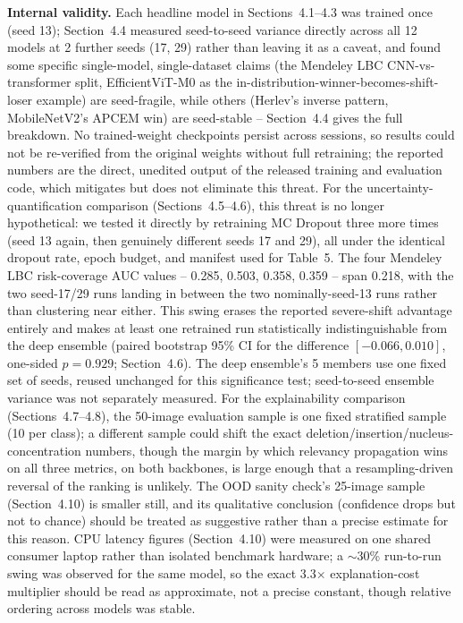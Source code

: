 \documentclass[runningheads]{llncs}
\begin{document}
\textbf{Internal validity.} Each headline model in Sections~4.1--4.3 was
trained once (seed 13); Section~4.4 measured seed-to-seed variance
directly across all 12 models at 2 further seeds (17, 29) rather than
leaving it as a caveat, and found some specific single-model,
single-dataset claims (the Mendeley LBC CNN-vs-transformer split,
EfficientViT-M0 as the in-distribution-winner-becomes-shift-loser
example) are seed-fragile, while others (Herlev's inverse pattern,
MobileNetV2's APCEM win) are seed-stable -- Section~4.4 gives the full
breakdown. No trained-weight checkpoints persist across sessions, so
results could not be re-verified from the original weights without full
retraining; the reported numbers are the direct, unedited output of the
released training and evaluation code, which mitigates but does not
eliminate this threat. For the uncertainty-quantification comparison
(Sections~4.5--4.6), this threat is no longer hypothetical: we tested it
directly by retraining MC Dropout three more times (seed 13 again, then
genuinely different seeds 17 and 29), all under the identical dropout
rate, epoch budget, and manifest used for Table~5. The four Mendeley LBC
risk-coverage AUC values -- 0.285, 0.503, 0.358, 0.359 -- span 0.218, with
the two seed-17/29 runs landing in between the two nominally-seed-13 runs
rather than clustering near either. This swing erases the reported
severe-shift advantage entirely and makes at least one retrained run
statistically indistinguishable from the deep ensemble (paired bootstrap
95\% CI for the difference $[-0.066, 0.010]$, one-sided $p=0.929$;
Section~4.6). The deep ensemble's 5 members use one fixed set of seeds,
reused unchanged for this significance test; seed-to-seed ensemble
variance was not separately measured. For the explainability comparison
(Sections~4.7--4.8), the 50-image evaluation sample is one fixed
stratified sample (10 per class); a different sample could shift the
exact deletion/insertion/nucleus-concentration numbers, though the margin
by which relevancy propagation wins on all three metrics, on both
backbones, is large enough that a resampling-driven reversal of the
ranking is unlikely. The OOD sanity check's 25-image sample (Section~4.10)
is smaller still, and its qualitative conclusion (confidence drops but not
to chance) should be treated as suggestive rather than a precise estimate
for this reason. CPU latency figures (Section~4.10) were measured on one
shared consumer laptop rather than isolated benchmark hardware; a
$\sim$30\% run-to-run swing was observed for the same model, so the exact
3.3$\times$ explanation-cost multiplier should be read as approximate,
not a precise constant, though relative ordering across models was
stable.
\end{document}
